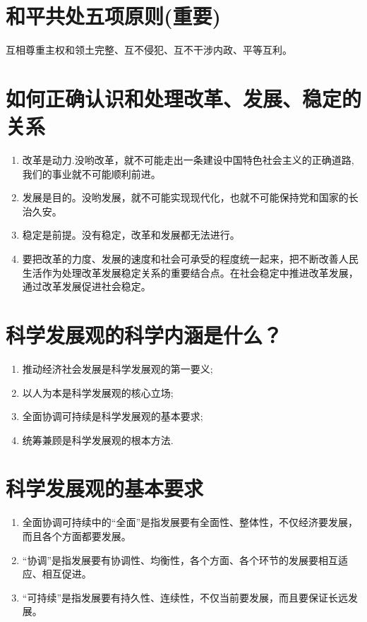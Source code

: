 \documentclass[12pt, a4paper, oneside]{ctexbook}
\begin{document}
\section{和平共处五项原则(重要)}

互相尊重主权和领土完整、互不侵犯、互不干涉内政、平等互利。

\section{如何正确认识和处理改革、发展、稳定的关系}

\begin{enumerate}
\item 改革是动力.没哟改革，就不可能走出一条建设中国特色社会主义的正确道路,我们的事业就不可能顺利前进。

\item 发展是目的。没哟发展，就不可能实现现代化，也就不可能保持党和国家的长治久安。

\item 稳定是前提。没有稳定，改革和发展都无法进行。

\item 要把改革的力度、发展的速度和社会可承受的程度统一起来，把不断改善人民生活作为处理改革发展稳定关系的重要结合点。在社会稳定中推进改革发展，通过改革发展促进社会稳定。
\end{enumerate}

\section{科学发展观的科学内涵是什么？}
\begin{enumerate}
\item 推动经济社会发展是科学发展观的第一要义;
\item 以人为本是科学发展观的核心立场;
\item 全面协调可持续是科学发展观的基本要求;
\item 统筹兼顾是科学发展观的根本方法.
\end{enumerate}

\section{科学发展观的基本要求}

\begin{enumerate}
\item 全面协调可持续中的“全面”是指发展要有全面性、整体性，不仅经济要发展，而且各个方面都要发展。

\item “协调”是指发展要有协调性、均衡性，各个方面、各个环节的发展要相互适应、相互促进。

\item “可持续”是指发展要有持久性、连续性，不仅当前要发展，而且要保证长远发展。
\end{enumerate}
\end{document}
